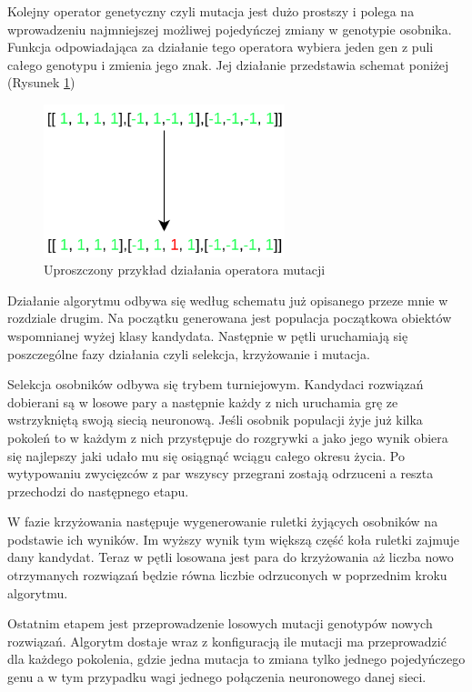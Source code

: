 \documentclass[12pt, oneside, a4paper]{report}
\begin{document}
Kolejny operator genetyczny czyli mutacja jest dużo prostszy i polega na wprowadzeniu najmniejszej możliwej pojedyńczej zmiany w genotypie osobnika. Funkcja odpowiadająca za działanie tego operatora wybiera jeden gen z puli całego genotypu i zmienia jego znak. Jej działanie przedstawia schemat poniżej (Rysunek \ref{fig: 4.3.mutation})

\begin{figure}[h]
	\centering
	\includegraphics[width=7cm]{fig432.png}
	\caption{Uproszczony przykład działania operatora mutacji}
	\label{fig: 4.3.mutation}
\end{figure}

Działanie algorytmu odbywa się według schematu już opisanego przeze mnie w rozdziale drugim. Na początku generowana jest populacja początkowa obiektów wspomnianej wyżej klasy kandydata. Następnie w pętli uruchamiają się poszczególne fazy działania czyli selekcja, krzyżowanie i mutacja.

Selekcja osobników odbywa się trybem turniejowym. Kandydaci rozwiązań dobierani są w losowe pary a następnie każdy z nich uruchamia grę ze wstrzykniętą swoją siecią neuronową. Jeśli osobnik populacji żyje już kilka pokoleń to w każdym z nich przystępuje do rozgrywki a jako jego wynik obiera się najlepszy jaki udało mu się osiągnąć wciągu całego okresu życia. Po wytypowaniu zwycięzców z par wszyscy przegrani zostają odrzuceni a reszta przechodzi do następnego etapu.

W fazie krzyżowania następuje wygenerowanie ruletki żyjących osobników na podstawie ich wyników. Im wyższy wynik tym większą część koła ruletki zajmuje dany kandydat. Teraz w pętli losowana jest para do krzyżowania aż liczba nowo otrzymanych rozwiązań będzie równa liczbie odrzuconych w poprzednim kroku algorytmu.

Ostatnim etapem jest przeprowadzenie losowych mutacji genotypów nowych rozwiązań. Algorytm dostaje wraz z konfiguracją ile mutacji ma przeprowadzić dla każdego pokolenia, gdzie jedna mutacja to zmiana tylko jednego pojedyńczego genu a w tym przypadku wagi jednego połączenia neuronowego danej sieci.
\end{document}
